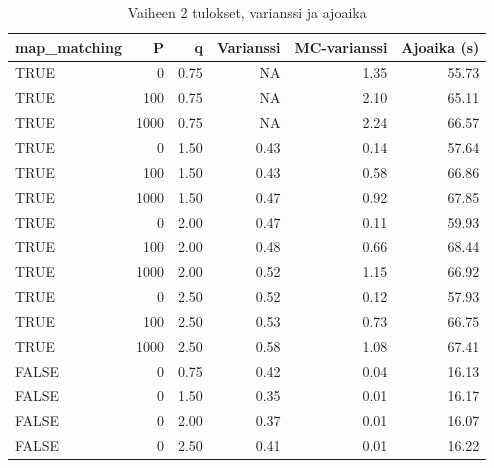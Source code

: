 \documentclass[
  12pt,
  a4paper, twoside]{book}
\begin{document}
\begin{table}

\caption{\label{tab:vaihe-2-tulokset-varianssi}Vaiheen 2 tulokset, varianssi ja ajoaika}
\centering
\begin{tabular}[t]{lrrrrr}
\toprule
map\_matching & P & q & Varianssi & MC-varianssi & Ajoaika (s)\\
\midrule
TRUE & 0 & 0.75 & NA & 1.35 & 55.73\\
TRUE & 100 & 0.75 & NA & 2.10 & 65.11\\
TRUE & 1000 & 0.75 & NA & 2.24 & 66.57\\
TRUE & 0 & 1.50 & 0.43 & 0.14 & 57.64\\
TRUE & 100 & 1.50 & 0.43 & 0.58 & 66.86\\
\addlinespace
TRUE & 1000 & 1.50 & 0.47 & 0.92 & 67.85\\
TRUE & 0 & 2.00 & 0.47 & 0.11 & 59.93\\
TRUE & 100 & 2.00 & 0.48 & 0.66 & 68.44\\
TRUE & 1000 & 2.00 & 0.52 & 1.15 & 66.92\\
TRUE & 0 & 2.50 & 0.52 & 0.12 & 57.93\\
\addlinespace
TRUE & 100 & 2.50 & 0.53 & 0.73 & 66.75\\
TRUE & 1000 & 2.50 & 0.58 & 1.08 & 67.41\\
FALSE & 0 & 0.75 & 0.42 & 0.04 & 16.13\\
FALSE & 0 & 1.50 & 0.35 & 0.01 & 16.17\\
FALSE & 0 & 2.00 & 0.37 & 0.01 & 16.07\\
\addlinespace
FALSE & 0 & 2.50 & 0.41 & 0.01 & 16.22\\
\bottomrule
\end{tabular}
\end{table}
\end{document}
